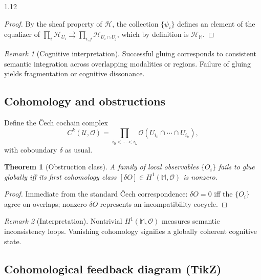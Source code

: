 \documentclass[12pt,a4paper]{article}
\numberwithin{equation}{section}
\newtheorem{theorem}{Theorem}[section]
\theoremstyle{remark}
\newtheorem{remark}{Remark}[section]
\theoremstyle{definition}
\newcommand{\M}{\mathbb{M}}
\begin{document}
\begin{spacing}{1.12}
\begin{proof}
By the sheaf property of $\mathscr{H}$,
the collection $\{\psi_i\}$ defines an element of the equalizer of
$\prod_i\mathcal{H}_{U_i}\rightrightarrows\prod_{i,j}\mathcal{H}_{U_i\cap U_j}$,
which by definition is $\mathcal{H}_\M$.
\end{proof}

\begin{remark}[Cognitive interpretation]
Successful gluing corresponds to consistent semantic integration across overlapping modalities or regions.
Failure of gluing yields fragmentation or cognitive dissonance.
\end{remark}

\subsection{Cohomology and obstructions}
\label{subsec:cohomology}

Define the Čech cochain complex
\[
C^k(\mathcal{U},\mathscr{O})=\prod_{i_0<\cdots<i_k}
\mathscr{O}(U_{i_0}\cap\cdots\cap U_{i_k}),
\]
with coboundary $\delta$ as usual.

\begin{theorem}[Obstruction class]
\label{thm:obstruction}
A family of local observables $\{O_i\}$ fails to glue globally
iff its first cohomology class
$[\delta O]\in H^1(\M,\mathscr{O})$
is nonzero.
\end{theorem}

\begin{proof}
Immediate from the standard Čech correspondence:
$\delta O=0$ iff the $\{O_i\}$ agree on overlaps;
nonzero $\delta O$ represents an incompatibility cocycle.
\end{proof}

\begin{remark}[Interpretation]
Nontrivial $H^1(\M,\mathscr{O})$
measures semantic inconsistency loops.
Vanishing cohomology signifies a globally coherent cognitive state.
\end{remark}

\subsection{Cohomological feedback diagram (TikZ)}
\label{subsec:cohomology-diagram}


\end{spacing}
\end{document}
